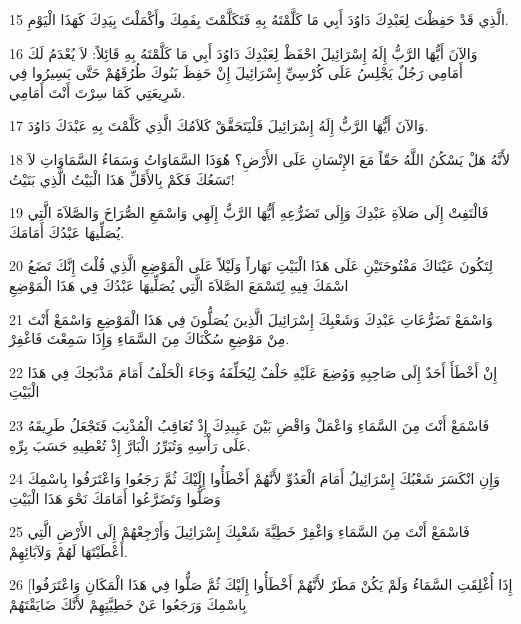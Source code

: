 \par 15 الَّذِي قَدْ حَفِظْتَ لِعَبْدِكَ دَاوُدَ أَبِي مَا كَلَّمْتَهُ بِهِ فَتَكَلَّمْتَ بِفَمِكَ وأَكْمَلْتَ بِيَدِكَ كَهَذَا الْيَوْمِ.
\par 16 وَالآنَ أَيُّهَا الرَّبُّ إِلَهُ إِسْرَائِيلَ احْفَظْ لِعَبْدِكَ دَاوُدَ أَبِي مَا كَلَّمْتَهُ بِهِ قَائِلاً: لاَ يُعْدَمُ لَكَ أَمَامِي رَجُلٌ يَجْلِسُ عَلَى كُرْسِيِّ إِسْرَائِيلَ إِنْ حَفِظَ بَنُوكَ طُرُقَهُمْ حَتَّى يَسِيرُوا فِي شَرِيعَتِي كَمَا سِرْتَ أَنْتَ أَمَامِي.
\par 17 وَالآنَ أَيُّهَا الرَّبُّ إِلَهُ إِسْرَائِيلَ فَلْيَتَحَقَّقْ كَلاَمُكَ الَّذِي كَلَّمْتَ بِهِ عَبْدَكَ دَاوُدَ.
\par 18 لأَنَّهُ هَلْ يَسْكُنُ اللَّهُ حَقّاً مَعَ الإِنْسَانِ عَلَى الأَرْضِ؟ هُوَذَا السَّمَاوَاتُ وَسَمَاءُ السَّمَاوَاتِ لاَ تَسَعُكَ فَكَمْ بِالأَقَلِّ هَذَا الْبَيْتُ الَّذِي بَنَيْتُ!
\par 19 فَالْتَفِتْ إِلَى صَلاَةِ عَبْدِكَ وَإِلَى تَضَرُّعِهِ أَيُّهَا الرَّبُّ إِلَهِي وَاسْمَعِ الصُّرَاخَ وَالصَّلاَةَ الَّتِي يُصَلِّيهَا عَبْدُكَ أَمَامَكَ.
\par 20 لِتَكُونَ عَيْنَاكَ مَفْتُوحَتَيْنِ عَلَى هَذَا الْبَيْتِ نَهَاراً وَلَيْلاً عَلَى الْمَوْضِعِ الَّذِي قُلْتَ إِنَّكَ تَضَعُ اسْمَكَ فِيهِ لِتَسْمَعَ الصَّلاَةَ الَّتِي يُصَلِّيهَا عَبْدُكَ فِي هَذَا الْمَوْضِعِ
\par 21 وَاسْمَعْ تَضَرُّعَاتِ عَبْدِكَ وَشَعْبِكَ إِسْرَائِيلَ الَّذِينَ يُصَلُّونَ فِي هَذَا الْمَوْضِعِ وَاسْمَعْ أَنْتَ مِنْ مَوْضِعِ سُكْنَاكَ مِنَ السَّمَاءِ وَإِذَا سَمِعْتَ فَاغْفِرْ.
\par 22 إِنْ أَخْطَأَ أَحَدٌ إِلَى صَاحِبِهِ وَوُضِعَ عَلَيْهِ حَلْفٌ لِيُحَلِّفَهُ وَجَاءَ الْحَلْفُ أَمَامَ مَذْبَحِكَ فِي هَذَا الْبَيْتِ
\par 23 فَاسْمَعْ أَنْتَ مِنَ السَّمَاءِ وَاعْمَلْ وَاقْضِ بَيْنَ عَبِيدِكَ إِذْ تُعَاقِبُ الْمُذْنِبَ فَتَجْعَلُ طَرِيقَهُ عَلَى رَأْسِهِ وَتُبَرِّرُ الْبَارَّ إِذْ تُعْطِيهِ حَسَبَ بِرِّهِ.
\par 24 وَإِنِ انْكَسَرَ شَعْبُكَ إِسْرَائِيلُ أَمَامَ الْعَدُوِّ لأَنَّهُمْ أَخْطَأُوا إِلَيْكَ ثُمَّ رَجَعُوا وَاعْتَرَفُوا بِاسْمِكَ وَصَلُّوا وَتَضَرَّعُوا أَمَامَكَ نَحْوَ هَذَا الْبَيْتِ
\par 25 فَاسْمَعْ أَنْتَ مِنَ السَّمَاءِ وَاغْفِرْ خَطِيَّةَ شَعْبِكَ إِسْرَائِيلَ وَأَرْجِعْهُمْ إِلَى الأَرْضِ الَّتِي أَعْطَيْتَهَا لَهُمْ وَلآبَائِهِمْ.
\par 26 [إِذَا أُغْلِقَتِ السَّمَاءُ وَلَمْ يَكُنْ مَطَرٌ لأَنَّهُمْ أَخْطَأُوا إِلَيْكَ ثُمَّ صَلُّوا فِي هَذَا الْمَكَانِ وَاعْتَرَفُوا بِاسْمِكَ وَرَجَعُوا عَنْ خَطِيَّتِهِمْ لأَنَّكَ ضَايَقْتَهُمْ
